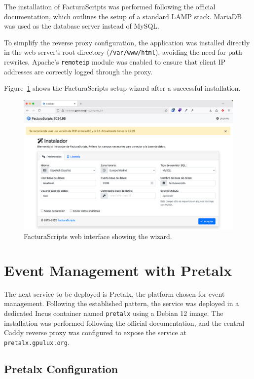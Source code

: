 The installation of FacturaScripts was performed following the official documentation\cite{facturascripts-install-linux}, which outlines the setup of a standard LAMP stack. MariaDB was used as the database server instead of MySQL.

To simplify the reverse proxy configuration, the application was installed directly in the web server's root directory (\texttt{/var/www/html}), avoiding the need for path rewrites. Apache's \texttt{remoteip} module was enabled to ensure that client IP addresses are correctly logged through the proxy.

Figure~\ref{fig:facturascripts-wizard} shows the FacturaScripts setup wizard after a successful installation.

\begin{figure}[H]
	\centering
	\includegraphics[width=\textwidth]{imaxes/facturascripts-wizard.png}
	\caption{FacturaScripts web interface showing the wizard.}
	\label{fig:facturascripts-wizard}
\end{figure}

\section{Event Management with Pretalx}

The next service to be deployed is Pretalx, the platform chosen for event management. Following the established pattern, the service was deployed in a dedicated Incus container named \texttt{pretalx} using a Debian 12 image. The installation was performed following the official documentation\cite{pretalx-install}, and the central Caddy reverse proxy was configured to expose the service at \texttt{pretalx.gpulux.org}.

\subsection*{Pretalx Configuration}


